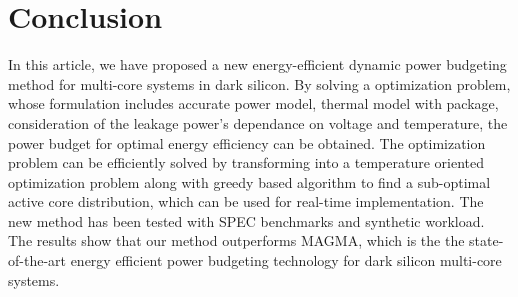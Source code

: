 \documentclass[10pt,journal,compsoc]{IEEEtran}
\begin{document}






\section{Conclusion}\label{sec:conclusion}

In this article, we have proposed a new energy-efficient dynamic power budgeting method for multi-core systems in dark silicon. By solving a optimization problem, whose formulation includes accurate power model, thermal model with package, consideration of the leakage power's dependance on voltage and temperature, the power budget for optimal energy efficiency can be obtained. The optimization problem can be efficiently solved by transforming into a temperature oriented optimization problem along with greedy based algorithm to find a sub-optimal active core distribution, which can be used for real-time implementation. The new method has been tested with SPEC benchmarks and synthetic workload. The results show that our method
outperforms MAGMA, which is the the state-of-the-art energy efficient power budgeting technology for dark silicon multi-core systems.



\end{document}
